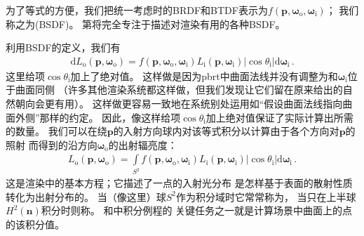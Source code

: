 为了等式的方便，我们把统一考虑时的BRDF和BTDF表示为$f({\bm p},{\bm \omega}_\mathrm{o},{\bm \omega}_\mathrm{i})$；
我们称之为(BSDF)。
第将完全专注于描述对渲染有用的各种BSDF。

利用BSDF的定义，我们有
\begin{align*}
    \mathrm{d}L_{\mathrm{o}}({\bm p},{\bm\omega}_{\mathrm{o}})=f({\bm p},{\bm \omega}_\mathrm{o},{\bm \omega}_\mathrm{i})L_{\mathrm{i}}({\bm p},{\bm\omega}_{\mathrm{i}})|\cos\theta_{\mathrm{i}}|\mathrm{d}{\bm\omega}_{\mathrm{i}}\, .
\end{align*}
这里给项$\cos\theta_{\mathrm{i}}$加上了绝对值。
这样做是因为pbrt中曲面法线并没有调整为和${\bm\omega}_{\mathrm{i}}$位于曲面同侧
（许多其他渲染系统都这样做，但我们发现让它们留在原来给出的自然朝向会更有用）。
这样做更容易一致地在系统别处运用如“假设曲面法线指向曲面外侧”那样的约定。
因此，像这样给项$\cos\theta_{\mathrm{i}}$加上绝对值保证了实际计算出所需的数量。
我们可以在绕$\bm p$的入射方向球内对该等式积分以计算由于各个方向对$\bm p$的照射
而得到的沿方向${\bm\omega}_{\mathrm{o}}$的出射辐亮度：
\begin{align}\label{eq:5.9}
    L_{\mathrm{o}}({\bm p},{\bm\omega}_{\mathrm{o}})=\int\limits_{S^2}f({\bm p},{\bm \omega}_\mathrm{o},{\bm \omega}_\mathrm{i})L_{\mathrm{i}}({\bm p},{\bm\omega}_{\mathrm{i}})|\cos\theta_{\mathrm{i}}|\mathrm{d}{\bm\omega}_{\mathrm{i}}\, .
\end{align}
这是渲染中的基本方程；它描述了一点的入射光分布
是怎样基于表面的散射性质转化为出射分布的。
当（像这里）球$S^2$作为积分域时它常常称为，
当只在上半球$H^2({\bm n})$积分时则称。
和中积分例程的
关键任务之一就是计算场景中曲面上的点的该积分值。

